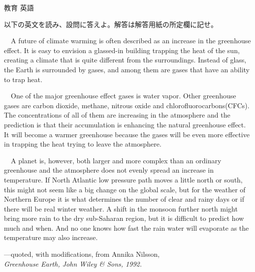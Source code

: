 \documentclass[fleqn]{jbook}
\begin{document}
\begin{question}{教育 英語}{}

\begin{subquestions}
\SubQuestion
  以下の英文を読み、設問に答えよ。解答は解答用紙の所定欄に記せ。
\baselineskip=12pt

  　A future of climate warming is often described as an increase in
  the greenhouse effect. It is easy to envision a glassed-in building
  trapping the heat of the sun, creating a climate that is quite
  different from the surroundings.
  Instead of glass, the Earth is surrounded by gases, and among them
  are gases that have an ability to trap heat.

  　One of the major greenhouse effect gases is water vapor. Other
  greenhouse gases are carbon dioxide, methane, nitrous oxide and
  chlorofluorocarbons(CFCs).
  The concentrations of all of them are increasing in the atmosphere
  and the prediction is that their accumulation is enhancing the
  natural greenhouse effect. It will become a warmer greenhouse
  because the gases will be even more effective in trapping the heat
  trying to leave the atmosphere.

  　A planet is, however, both larger and more complex than an
  ordinary greenhouse and the atmosphere does not evenly spread an
  increase in temperature.
  If North Atlantic low pressure path moves a little north or south,
  this might not seem like a big change on the global scale, but for
  the weather of Northern Europe it is what determines the number of
  clear and rainy days or if there will be real winter weather. A
  shift in the monsoon further north might bring more rain to the dry
  sub-Saharan region, but it is difficult to predict how much and when.
  And no one knows how fast the rain water will evaporate as the
  temperature may also increase. 
%
  \begin{flushright}
    ---quoted, with modifications, from Annika Nilsson,\\
    \em Greenhouse Earth, \em John Wiley \& Sons, 1992.
  \end{flushright}


\end{subquestions}
\end{question}
\end{document}
